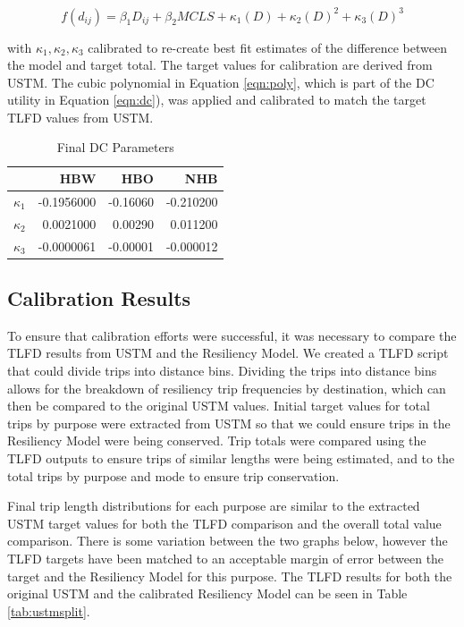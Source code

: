 \begin{equation}
  f(d_{ij}) = \beta_1 D_{ij} + \beta_2 MCLS + \kappa_
  1(D)+\kappa_2(D)^2+\kappa_3(D)^3
	\label{eqn:poly}
\end{equation}

\noindent with $\kappa_1,\kappa_2,\kappa_3$ calibrated to re-create best fit
estimates of the difference between the model and target total. The target
values for calibration are derived from USTM. The cubic polynomial in
Equation \ref{eqn:poly}, which is part of the DC utility in
Equation \ref{eqn:dc}), was applied and calibrated to match the target TLFD values from USTM.

\begin{table}

\caption{\label{tab:finaldc}Final DC Parameters}
\centering
\begin{tabular}[t]{lrrr}
\toprule
 & HBW & HBO & NHB\\
\midrule
$\kappa_1$ & -0.1956000 & -0.16060 & -0.210200\\
$\kappa_2$ & 0.0021000 & 0.00290 & 0.011200\\
$\kappa_3$ & -0.0000061 & -0.00001 & -0.000012\\
\bottomrule
\end{tabular}
\end{table}

\subsection{Calibration Results}

To ensure that calibration efforts were successful, it was necessary to
compare the TLFD results from USTM and the Resiliency Model. We created a
TLFD script that could divide trips
into distance bins. Dividing the trips into distance bins allows for the
breakdown of resiliency trip frequencies by destination, which can then be
compared to the original USTM values. Initial target values for total
trips by purpose were extracted from USTM so that we could ensure trips in
the Resiliency Model were being conserved. Trip totals were compared using
the TLFD outputs to ensure trips of similar lengths were being estimated,
and to the total trips by purpose and mode to ensure trip conservation.

Final trip length distributions for each purpose are similar to the
extracted USTM target values for both the TLFD comparison and the overall
total value comparison. There is some variation between the two graphs
below, however the TLFD targets have been matched to an acceptable margin
of error between the target and the Resiliency Model for this purpose. The
TLFD results for both the original USTM and the calibrated Resiliency
Model can be seen in Table \ref{tab:ustmsplit}.

